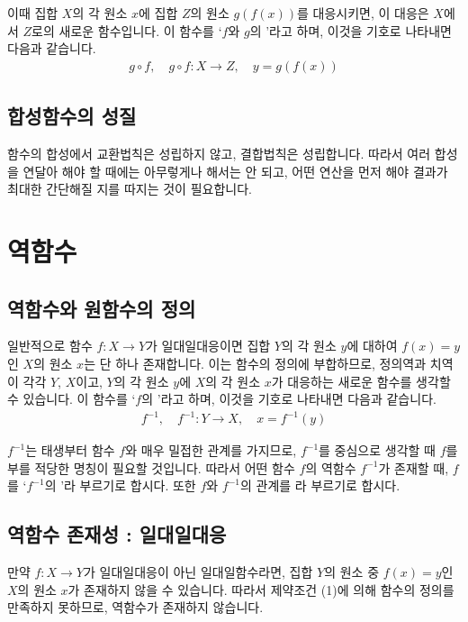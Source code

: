 이때 집합 $X$의 각 원소 $x$에 집합 $Z$의 원소 $g\left( f\left( x \right)  \right) $를 대응시키면, 이 대응은 $X$에서 $Z$로의 새로운 함수입니다. 이 함수를 `$f$와 $g$의 '라고 하며, 이것을 기호로 나타내면 다음과 같습니다.
\begin{align*} g \circ f, \quad  g \circ f : X \longrightarrow Z, \quad  y=g\left( f\left( x \right)  \right)  \end{align*}

\subsection{합성함수의 성질}
함수의 합성에서 교환법칙은 성립하지 않고, 결합법칙은 성립합니다. 따라서 여러 합성을 연달아 해야 할 때에는 아무렇게나 해서는 안 되고, 어떤 연산을 먼저 해야 결과가 최대한 간단해질 지를 따지는 것이 필요합니다.

\section{역함수}
\subsection{역함수와 원함수의 정의}
일반적으로 함수 $f:X \longrightarrow Y$가 일대일대응이면 집합 $Y$의 각 원소 $y$에 대하여 $f(x)=y$인 $X$의 원소 $x$는 단 하나 존재합니다. 이는 함수의 정의에 부합하므로, 정의역과 치역이 각각 $Y$, $X$이고, $Y$의 각 원소 $y$에 $X$의 각 원소 $x$가 대응하는 새로운 함수를 생각할 수 있습니다. 이 함수를 `$f$의 '라고 하며, 이것을 기호로 나타내면 다음과 같습니다. 
\begin{align*} f^{-1}, \quad f^{-1} : Y \longrightarrow X, \quad x=f^{-1}\left( y \right) \end{align*}

$f^{-1}$는 태생부터 함수 $f$와 매우 밀접한 관계를 가지므로, $f^{-1}$를 중심으로 생각할 때 $f$를 부를 적당한 명칭이 필요할 것입니다. 따라서 어떤 함수 $f$의 역함수 $f^{-1}$가 존재할 때, $f$를 `$f^{-1}$의 '라 부르기로 합시다. 또한 $f$와 $f^{-1}$의 관계를 라 부르기로 합시다.

\subsection{역함수 존재성 : 일대일대응}
만약 $f:X \longrightarrow Y$가 일대일대응이 아닌 일대일함수라면, 집합 $Y$의 원소 중  $f(x)=y$인 $X$의 원소 $x$가 존재하지 않을 수 있습니다. 따라서 제약조건 (1)에 의해 함수의 정의를 만족하지 못하므로, 역함수가 존재하지 않습니다.


